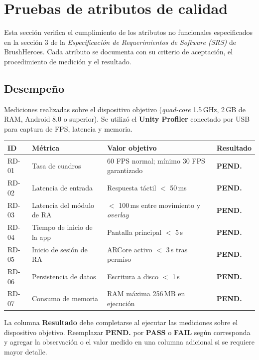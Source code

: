\documentclass[12pt, a4paper]{article}
\newcommand{\pass}{\textcolor{heroGreen}{\textbf{PASS}}}
\newcommand{\fail}{\textcolor{heroRed}{\textbf{FAIL}}}
\newcommand{\pending}{\textcolor{heroOrange}{\textbf{PEND.}}}
\begin{document}
\section{Pruebas de atributos de calidad}

Esta sección verifica el cumplimiento de los atributos no funcionales
especificados en la sección 3 de la \textit{Especificación de Requerimientos
de Software (SRS)} de BrushHeroes. Cada atributo se documenta con su criterio
de aceptación, el procedimiento de medición y el resultado.

\subsection{Desempeño}

Mediciones realizadas sobre el dispositivo objetivo (\textit{quad-core} 1.5\,GHz,
2\,GB de RAM, Android 8.0 o superior). Se utilizó el \textbf{Unity Profiler}
conectado por USB para captura de FPS, latencia y memoria.

\renewcommand{\arraystretch}{1.3}
\begin{longtable}{>{\ttfamily\small}p{1.5cm} p{4.5cm} p{4cm} >{\centering\arraybackslash}p{1.7cm}}
  \toprule
  \textbf{ID} & \textbf{Métrica} & \textbf{Valor objetivo} & \textbf{Resultado} \\
  \midrule
  \endhead
  RD-01 & Tasa de cuadros           & 60 FPS normal; mínimo 30 FPS garantizado & \pending \\
  RD-02 & Latencia de entrada       & Respuesta táctil $<$ 50\,ms              & \pending \\
  RD-03 & Latencia del módulo de RA & $<$ 100\,ms entre movimiento y \textit{overlay} & \pending \\
  RD-04 & Tiempo de inicio de la app & Pantalla principal $<$ 5\,s & \pending \\
  RD-05 & Inicio de sesión de RA    & ARCore activo $<$ 3\,s tras permiso & \pending \\
  RD-06 & Persistencia de datos     & Escritura a disco $<$ 1\,s & \pending \\
  RD-07 & Consumo de memoria        & RAM máxima 256\,MB en ejecución & \pending \\
  \bottomrule
\end{longtable}

\begin{notebox}
La columna \textbf{Resultado} debe completarse al ejecutar las mediciones
sobre el dispositivo objetivo. Reemplazar \pending{} por \pass{} o \fail{}
según corresponda y agregar la observación o el valor medido en una columna
adicional si se requiere mayor detalle.
\end{notebox}
\end{document}

